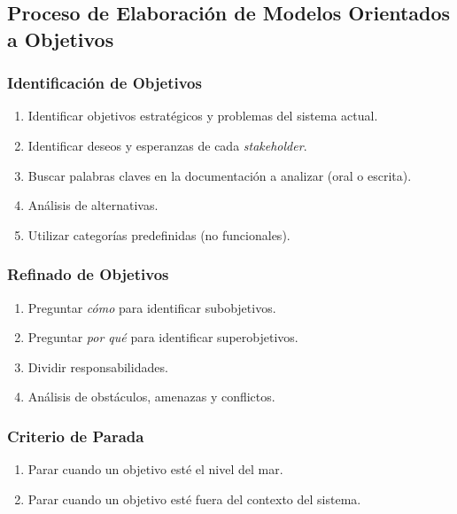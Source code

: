 \documentclass[slidestop,xcolor=pst,dvips,blue]{beamer}
\begin{document}

\subsection[Proceso de Modelado de Objetivos]{Proceso de Elaboración de Modelos Orientados a Objetivos}

\begin{frame}[c]
    \frametitle{Identificación de Objetivos}
    \begin{enumerate}[<+->]
         \item Identificar objetivos estratégicos y problemas del sistema actual.
         \item Identificar deseos y esperanzas de cada \emph{stakeholder}.
         \item Buscar palabras claves en la documentación a analizar (oral o escrita).
         \item Análisis de alternativas.
         \item Utilizar categorías predefinidas (no funcionales).
    \end{enumerate}
\end{frame}

\begin{frame}[c]
    \frametitle{Refinado de Objetivos}
    \begin{enumerate}[<+->]
         \item Preguntar \emph{cómo} para identificar subobjetivos.
         \item Preguntar \emph{por qué} para identificar superobjetivos.
         \item Dividir responsabilidades.
         \item Análisis de obstáculos, amenazas y conflictos.
    \end{enumerate}
\end{frame}

\begin{frame}[c]
    \frametitle{Criterio de Parada}
    \begin{enumerate}[<+->]
         \item Parar cuando un objetivo esté el nivel del mar.
         \item Parar cuando un objetivo esté fuera del contexto del sistema.
    \end{enumerate}
\end{frame}
\end{document}
